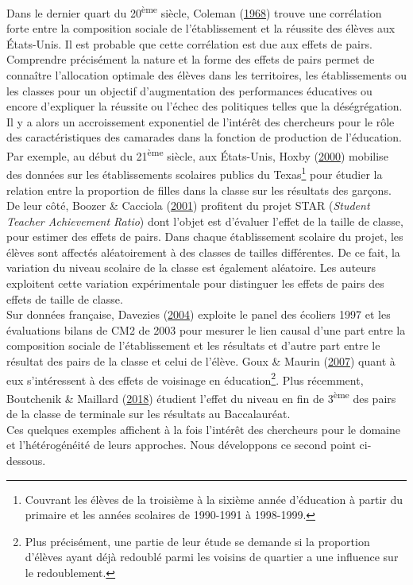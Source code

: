 \documentclass[
]{book}
\begin{document}
Dans le dernier quart du 20\textsuperscript{ème} siècle, Coleman (\protect\hyperlink{ref-COL:68}{1968}) trouve une corrélation forte entre la composition sociale de l'établissement et la réussite des élèves aux États-Unis. Il est probable que cette corrélation est due aux effets de pairs. Comprendre précisément la nature et la forme des effets de pairs permet de connaître l'allocation optimale des élèves dans les territoires, les établissements ou les classes pour un objectif d'augmentation des performances éducatives ou encore d'expliquer la réussite ou l'échec des politiques telles que la déségrégation. Il y a alors un accroissement exponentiel de l'intérêt des chercheurs pour le rôle des caractéristiques des camarades dans la fonction de production de l'éducation.\\
Par exemple, au début du 21\textsuperscript{ème} siècle, aux États-Unis, Hoxby (\protect\hyperlink{ref-HOX:00}{2000}) mobilise des données sur les établissements scolaires publics du Texas\footnote{Couvrant les élèves de la troisième à la sixième année d'éducation à partir du primaire et les années scolaires de 1990-1991 à 1998-1999.} pour étudier la relation entre la proportion de filles dans la classe sur les résultats des garçons. De leur côté, Boozer \& Cacciola (\protect\hyperlink{ref-BOO:CAC:01}{2001}) profitent du projet STAR (\emph{Student Teacher Achievement Ratio}) dont l'objet est d'évaluer l'effet de la taille de classe, pour estimer des effets de pairs. Dans chaque établissement scolaire du projet, les élèves sont affectés aléatoirement à des classes de tailles différentes. De ce fait, la variation du niveau scolaire de la classe est également aléatoire. Les auteurs exploitent cette variation expérimentale pour distinguer les effets de pairs des effets de taille de classe.\\
Sur données française, Davezies (\protect\hyperlink{ref-DAV:04}{2004}) exploite le panel des écoliers 1997 et les évaluations bilans de CM2 de 2003 pour mesurer le lien causal d'une part entre la composition sociale de l'établissement et les résultats et d'autre part entre le résultat des pairs de la classe et celui de l'élève. Goux \& Maurin (\protect\hyperlink{ref-GOU:MAU:07}{2007}) quant à eux s'intéressent à des effets de voisinage en éducation\footnote{Plus précisément, une partie de leur étude se demande si la proportion d'élèves ayant déjà redoublé parmi les voisins de quartier a une influence sur le redoublement.}. Plus récemment, Boutchenik \& Maillard (\protect\hyperlink{ref-BOU:MAI:18}{2018}) étudient l'effet du niveau en fin de 3\textsuperscript{ème} des pairs de la classe de terminale sur les résultats au Baccalauréat.\\
Ces quelques exemples affichent à la fois l'intérêt des chercheurs pour le domaine et l'hétérogénéité de leurs approches. Nous développons ce second point ci-dessous.
\end{document}
